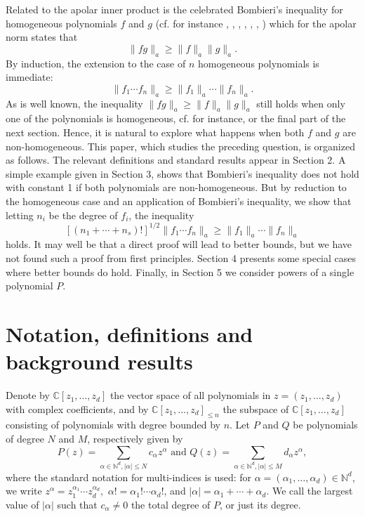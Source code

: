 \documentclass[12pt]{amsart}
\begin{document}
Related to the apolar inner product is the celebrated Bombieri's inequality for homogeneous polynomials $f$ and $g$ (cf. for instance \cite{BBEM90}, \cite{Beau92}, \cite{Beau96}, \cite{Beau97}, \cite{Etay21}, \cite{Pina12}, \cite{Zeil}) which for the apolar norm
  states that
$$\|f g\|_a \ge \|f\|_a \|g\|_a.
$$
By induction, the extension to the case of $n$ homogeneous polynomials is immediate:
\begin{equation}\label{multBombieri}
\|f_1 \cdots f_n\|_a \ge \|f_1\|_a \cdots \|f_n\|_a.
\end{equation}
 As is well known, the inequality $\|f g\|_a \ge \|f\|_a \|g\|_a$ still holds when only one of the polynomials is homogeneous, cf. \cite{Zeil} for instance, or the final part of the next section.
Hence, it is natural to explore what happens when both  $f$ and $g$ are non-homogeneous. This paper, which studies the preceding question, is organized as follows.
The relevant definitions and standard results appear in Section 2. A simple example given in Section 3, shows that Bombieri's inequality does not hold with constant 1 if both polynomials are non-homogeneous. But by reduction to the homogeneous case and an application of Bombieri's inequality, we show that letting $n_i$ be the degree of $f_i$, the inequality
	\[
[(n_1 +  \cdots + n_s)! ]^{1/2 }\|f_1 \cdots f_n\|_a \ge \|f_1\|_a \cdots \|f_n\|_a
\]		
 holds. It may well be that a direct proof will lead to better bounds, 
but we have not found such a proof from first principles. Section 4 presents some special cases where better bounds do hold. Finally, in Section 5 we consider powers of a single polynomial $P$. 

\section{Notation, definitions and background results}

Denote by $\mathbb{C}[z_{1},\dots,z_{d}]$ the vector space of all
polynomials  in  $z=\left(  z_{1},\dots,z_{d}\right)$ with complex coefficients, and by $\mathbb{C} [z_{1},\dots,z_{d}]_{\le n}$  the subspace of  $\mathbb{C}[z_{1},\dots,z_{d}]$ consisting of polynomials with degree bounded by $n$.
Let $P$ and $Q$ be polynomials of degree $N$ and $M$, respectively given by
\[
P\left(  z \right)  =\sum_{\alpha\in\mathbb{N}^{d},\left\vert
\alpha\right\vert \leq N}c_{\alpha}z ^{\alpha}\text{ and }Q\left(  z\right)
=\sum_{\alpha\in\mathbb{N}^{d},\left\vert \alpha\right\vert \leq
M}d_{\alpha}z^{\alpha},
\]
where the standard notation for multi-indices is used: for $\alpha=\left(  \alpha
_{1},\dots ,\alpha_{d}\right)  \in\mathbb{N}^{d}
$, we write   $z^{\alpha
}=z_{1}^{\alpha_{1}}\cdots  z_{d}^{\alpha_{d}},$  $\alpha!=\alpha_{1}
! \cdots \alpha_{d}!$, and $\left\vert \alpha\right\vert =\alpha_{1}+\cdots
+\alpha_{d}$. We call the largest value of $\left\vert \alpha\right\vert $ such that $c_\alpha \ne 0$ the total degree of $P$, or
just its degree.
\end{document}
